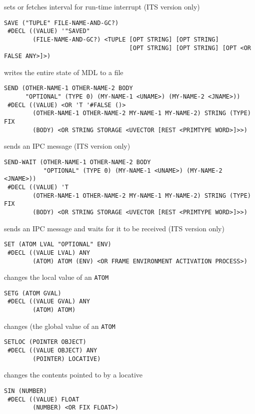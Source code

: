 \documentclass[a4paper,]{article}
\begin{document}
sets or fetches interval for run-time interrupt (ITS version only)

\begin{verbatim}
SAVE ("TUPLE" FILE-NAME-AND-GC?)
 #DECL ((VALUE) '"SAVED"
        (FILE-NAME-AND-GC?) <TUPLE [OPT STRING] [OPT STRING]
                                   [OPT STRING] [OPT STRING] [OPT <OR FALSE ANY>]>)
\end{verbatim}

writes the entire state of MDL to a file

\begin{verbatim}
SEND (OTHER-NAME-1 OTHER-NAME-2 BODY
      "OPTIONAL" (TYPE 0) (MY-NAME-1 <UNAME>) (MY-NAME-2 <JNAME>))
 #DECL ((VALUE) <OR 'T '#FALSE ()>
        (OTHER-NAME-1 OTHER-NAME-2 MY-NAME-1 MY-NAME-2) STRING (TYPE) FIX
        (BODY) <OR STRING STORAGE <UVECTOR [REST <PRIMTYPE WORD>]>>)
\end{verbatim}

sends an IPC message (ITS version only)

\begin{verbatim}
SEND-WAIT (OTHER-NAME-1 OTHER-NAME-2 BODY
           "OPTIONAL" (TYPE 0) (MY-NAME-1 <UNAME>) (MY-NAME-2 <JNAME>))
 #DECL ((VALUE) 'T
        (OTHER-NAME-1 OTHER-NAME-2 MY-NAME-1 MY-NAME-2) STRING (TYPE) FIX
        (BODY) <OR STRING STORAGE <UVECTOR [REST <PRIMTYPE WORD>]>>)
\end{verbatim}

sends an IPC message and waits for it to be received (ITS version only)

\begin{verbatim}
SET (ATOM LVAL "OPTIONAL" ENV)
 #DECL ((VALUE LVAL) ANY
        (ATOM) ATOM (ENV) <OR FRAME ENVIRONMENT ACTIVATION PROCESS>)
\end{verbatim}

changes the local value of an \texttt{ATOM}

\begin{verbatim}
SETG (ATOM GVAL)
 #DECL ((VALUE GVAL) ANY
        (ATOM) ATOM)
\end{verbatim}

changes (the global value of an \texttt{ATOM}

\begin{verbatim}
SETLOC (POINTER OBJECT)
 #DECL ((VALUE OBJECT) ANY
        (POINTER) LOCATIVE)
\end{verbatim}

changes the contents pointed to by a locative

\begin{verbatim}
SIN (NUMBER)
 #DECL ((VALUE) FLOAT
        (NUMBER) <OR FIX FLOAT>)
\end{verbatim}
\end{document}
